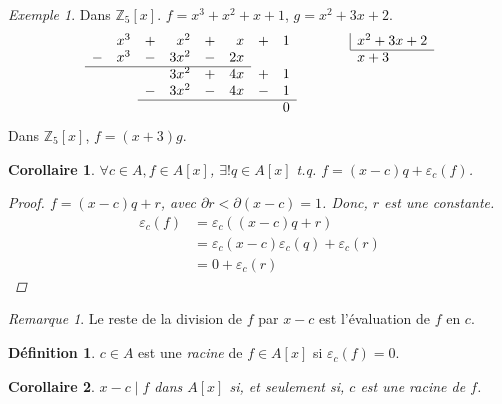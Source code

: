 \documentclass{report}
\newtheorem*{coro}{Corollaire}
\theoremstyle{definition}
\newtheorem*{dfn}{D\'efinition}
\theoremstyle{remark}
\newtheorem*{exem}{Exemple}
\newtheorem*{rmq}{Remarque}
\def\ZZ{\mathbb{Z}}
\newcommand*{\arst}[1]{\renewcommand{\arraystretch}{#1}}
\begin{document}
	\begin{exem}
		Dans $\ZZ_5[x]$. $f=x^3+x^2+x+1$, $g=x^2+3x+2$.
		\arst{1.2}
		\[ \begin{array}{rrrrrrrrp{1cm}l}
			&x^3&+&x^2&+&x&+&1&&\multicolumn{1}{|l}{x^2+3x+2}\\
			\cline{10-10} -&x^3&-&3x^2&-&2x&&&&x+3\\
			\cline{1-6} &&&3x^2&+&4x&+&1\\
			&&-&3x^2&-&4x&-&1\\
			\cline{3-8} &&&&&&&0
		\end{array} \]
		\arst{1}
		Dans $\ZZ_5[x]$, $f=(x+3)g$.
	\end{exem}

	\begin{coro}
		$\forall c\in A, f\in A[x]$, $\exists! q\in A[x]$ t.q. $f=(x-c)q+\varepsilon_c(f)$.
		\begin{proof}
			$f=(x-c)q+r$, avec $\partial r<\partial(x-c)=1$. Donc, $r$ est une constante.
			\begin{align*}
				\varepsilon_c(f)&= \varepsilon_c((x-c)q+r)\\
				&= \varepsilon_c(x-c) \varepsilon_c(q) + \varepsilon_c(r)\\
				&= 0+\varepsilon_c(r)
			\end{align*}
		\end{proof}
	\end{coro}

	\begin{rmq}
		Le reste de la division de $f$ par $x-c$ est l'\'evaluation de $f$ en $c$.
	\end{rmq}

	\begin{dfn}
		$c\in A$ est une \emph{racine} de $f\in A[x]$ si $\varepsilon_c(f)=0$.
	\end{dfn}

	\begin{coro}
		$x-c \mid f$ dans $A[x]$ si, et seulement si, $c$ est une racine de $f$.
	\end{coro}
\end{document}
